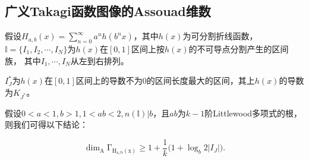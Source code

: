 \subsection{广义Takagi函数图像的Assouad维数}

假设$H_{a,b}(x)=\sum_{n=0}^\infty a^nh(b^nx)$，其中$h(x)$为可分割折线函数，
$\mathbb{I}=\{I_1,I_2,\cdots,I_N\}$为$h(x)$在$[0,1]$区间上按$h(x)$的不可导点分割产生的区间族，
其中$I_1,\cdots,I_N$从左到右排列。

$I_J^*$为$h(x)$在$[0,1]$区间上的导数不为$0$的区间长度最大的区间，其上$h(x)$的导数为$K_{J^*}$。

假设$0<a<1,b>1,1<ab<2,n(\mathbb{I})|b$，且$ab$为$k-1$阶Littlewood多项式的根，则我们可得以下结论：

$$
      \mathrm{\dim_A\Gamma_{H_{a,b}(x)}}\ge1+\frac{1}{k}\Big(1+\log_b2|I_J|\Big).
$$


